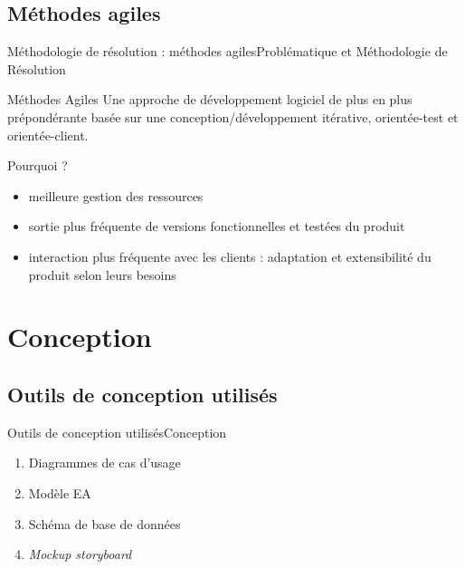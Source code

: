 \documentclass[usenames,dvipsnames]{beamer}
\begin{document}
\subsection{Méthodes agiles}
\begin{frame}{Méthodologie de résolution : méthodes agiles}{Problématique et Méthodologie de Résolution}
\begin{block}{Méthodes Agiles}
Une approche de développement logiciel de plus en plus prépondérante basée sur une conception/développement itérative, orientée-test et orientée-client.
\end{block}

\begin{block}{Pourquoi ?}
\begin{itemize}
  \item meilleure gestion des ressources
  \item sortie plus fréquente de versions fonctionnelles et testées du produit
  \item interaction plus fréquente avec les clients : adaptation et extensibilité du produit selon leurs besoins
\end{itemize}
\end{block}
\end{frame}
\section{Conception}
\subsection{Outils de conception utilisés}

\begin{frame}{Outils de conception utilisés}{Conception}
\begin{enumerate}
  \item Diagrammes de cas d'usage
  \item Modèle EA
  \item Schéma de base de données
  \item \textit{Mockup storyboard}
\end{enumerate}
\end{frame}
\end{document}
